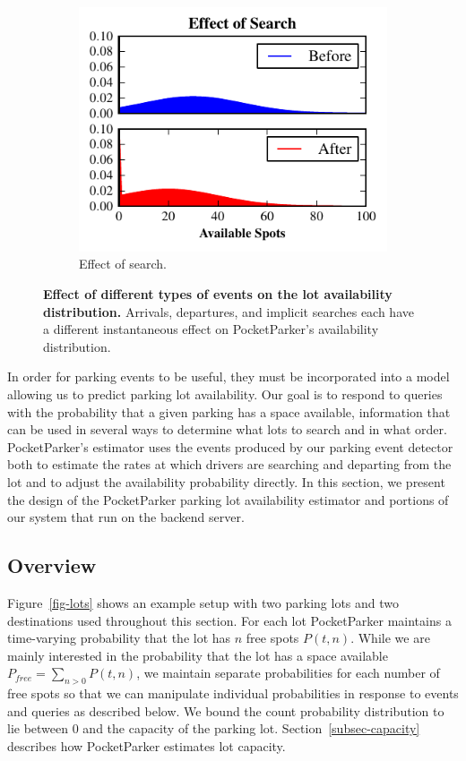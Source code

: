 \begin{figure}
\begin{subfigure}[b]{0.33\textwidth}
    \includegraphics[width=\textwidth]{./figures/search.pdf}
    \caption{Effect of search.}
    \label{fig-examples-search}
  \end{subfigure}
  \caption{\textbf{Effect of different types of events on the lot availability
  distribution.} Arrivals, departures, and implicit searches each have a
  different instantaneous effect on PocketParker's availability distribution.}
  \label{fig-examples}
\end{figure}

In order for parking events to be useful, they must be incorporated into a
model allowing us to predict parking lot availability. Our goal is to respond
to queries with the probability that a given parking has a space available,
information that can be used in several ways to determine what lots to search
and in what order. PocketParker's estimator uses the events produced by our
parking event detector both to estimate the rates at which drivers are
searching and departing from the lot and to adjust the availability
probability directly. In this section, we present the design of the
PocketParker parking lot availability estimator and portions of our system
that run on the backend server.

\subsection{Overview}

Figure~\ref{fig-lots} shows an example setup with two parking lots and two
destinations used throughout this section. For each lot PocketParker
maintains a time-varying probability that the lot has $n$ free spots $P(t,
n)$. While we are mainly interested in the probability that the lot has a
space available $P_{free} = \sum_{n > 0} P(t, n)$, we maintain separate
probabilities for each number of free spots so that we can manipulate
individual probabilities in response to events and queries as described
below. We bound the count probability distribution to lie between 0 and the
capacity of the parking lot. Section~\ref{subsec-capacity} describes how
PocketParker estimates lot capacity.

